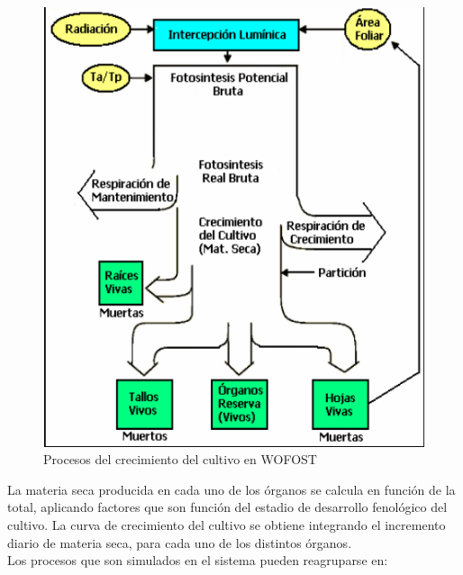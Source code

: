 \begin{figure}[!h]
	\centering
	\includegraphics[scale=0.8]{Images/proceso_de_crecimiento_del_cultivo_wofost.png}
	\caption{Procesos del crecimiento del cultivo en WOFOST \parencite{sebem2005aportaciones}}
	\label{fig:img_3}
\end{figure}

La materia seca producida en cada uno de los órganos se calcula en función de la total, aplicando factores que son función del estadio de desarrollo fenológico del cultivo. La curva de crecimiento del cultivo se obtiene integrando el incremento diario de materia seca, para cada uno de los distintos órganos.\\

Los procesos que son simulados en el sistema pueden reagruparse en:


